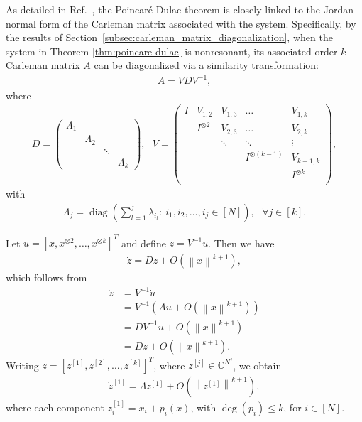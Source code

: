 \documentclass[superscriptaddress,onecolumn,nofootinbib,longbibliography,a4paper,accepted=2026-09-29]{quantumarticle}
\theoremstyle{plain}
\theoremstyle{definition}
\numberwithin{thm}{section}
\numberwithin{assumption}{section}
\numberwithin{lemma}{section}
\numberwithin{prop}{section}
\numberwithin{cor}{section}
\numberwithin{definition}{section}
\numberwithin{rmk}{section}
\numberwithin{equation}{section}
\newcommand{\norm}[1]     {\left\| #1 \right\|}
\newcommand{\myC}{\mathbb{C}}
\newcommand{\lrb}[1]{\left ( #1 \right )}
\newcommand{\myO}[1]{O\lrb{#1}}
\newcommand{\diag}[1]{\operatorname{diag}\lrb{#1}}
\begin{document}
As detailed in Ref.~\cite{tsiligiannis1989normal}, the Poincar\'{e}-Dulac theorem is closely linked to the Jordan normal form of the Carleman matrix associated with the system. Specifically, by the results of Section~\ref{subsec:carleman_matrix_diagonalization}, 
when the system in Theorem \ref{thm:poincare-dulac} is nonresonant, its associated order-$k$ Carleman matrix $A$ can be diagonalized via a similarity transformation:
\begin{align}
    A=V D V^{-1},
\end{align}
where
\begin{align}
    D=\begin{pmatrix}
        \Lambda_1  &           &        & \\
                 & \Lambda_2 &        & \\
                 &           & \ddots & \\
                 &           &      &\Lambda_k \end{pmatrix},~~~
        V=\begin{pmatrix}
        I  & {V}_{1,2}   &  {V}_{1,3} & \dots  & {V}_{1,k} \\
                 & I^{\otimes 2}   &  {V}_{2,3} & \dots & {V}_{2,k} \\
                 &           & \ddots &   \ddots       & \vdots \\
                 &           &          & I^{\otimes (k-1)} & {V}_{k-1, k} \\
                &           &          &  & I^{\otimes k} \\\end{pmatrix},     
\end{align}
with
\begin{align}
    \Lambda_j=\diag{\sum_{l=1}^j \lambda_{i_l}:~i_1, i_2,\dots,i_j\in [N]}, ~~~\forall j \in [k].
\end{align}

Let $u=[x, x^{\otimes 2}, \dots, x^{\otimes k}]^T$ and define $z=V^{-1}u$. Then we have
\begin{align}
    \dot{z}=Dz+\myO{\norm{x}^{k+1}},
\end{align}
which follows from
\begin{equation}
\begin{aligned}
    \dot{z}&=V^{-1}\dot{u}\\
    &= V^{-1}\lrb{Au+\myO{\norm{x}^{k+1}}} \\
    &=DV^{-1}u+\myO{\norm{x}^{k+1}}\\
    &=Dz+\myO{\norm{x}^{k+1}}.    
\end{aligned}
\end{equation}
Writing $z=[z^{[1]},z^{[2]},\dots,z^{[k]}]^T$, where $z^{[j]} \in \myC^{N^j}$, we obtain
\begin{align}
\dot{z}^{[1]}=\Lambda z^{[1]}+\myO{\norm{z^{[1]}}^{k+1}},    
\end{align}
where each component $z^{[1]}_i=x_i+p_i(x)$, with  $\operatorname{deg}(p_i) \le k$, for $i \in [N]$.
\end{document}
